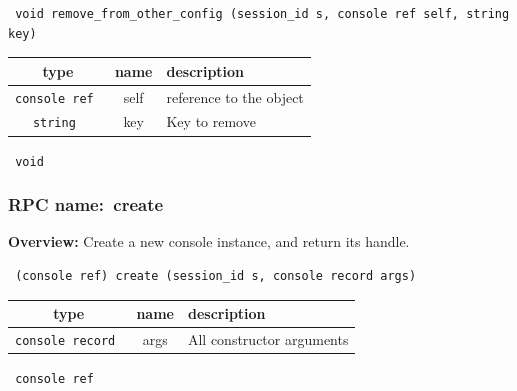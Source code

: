 \begin{verbatim} void remove_from_other_config (session_id s, console ref self, string key)\end{verbatim}



 
\vspace{0.3cm}
\begin{tabular}{|c|c|p{7cm}|}
 \hline
{\bf type} & {\bf name} & {\bf description} \\ \hline
{\tt console ref } & self & reference to the object \\ \hline 

{\tt string } & key & Key to remove \\ \hline 

\end{tabular}

\vspace{0.3cm}

{\tt 
void
}



\vspace{0.3cm}
\vspace{0.3cm}
\vspace{0.3cm}
\subsubsection{RPC name:~create}

{\bf Overview:} 
Create a new console instance, and return its handle.

\begin{verbatim} (console ref) create (session_id s, console record args)\end{verbatim}



 
\vspace{0.3cm}
\begin{tabular}{|c|c|p{7cm}|}
 \hline
{\bf type} & {\bf name} & {\bf description} \\ \hline
{\tt console record } & args & All constructor arguments \\ \hline 

\end{tabular}

\vspace{0.3cm}

{\tt 
console ref
}


